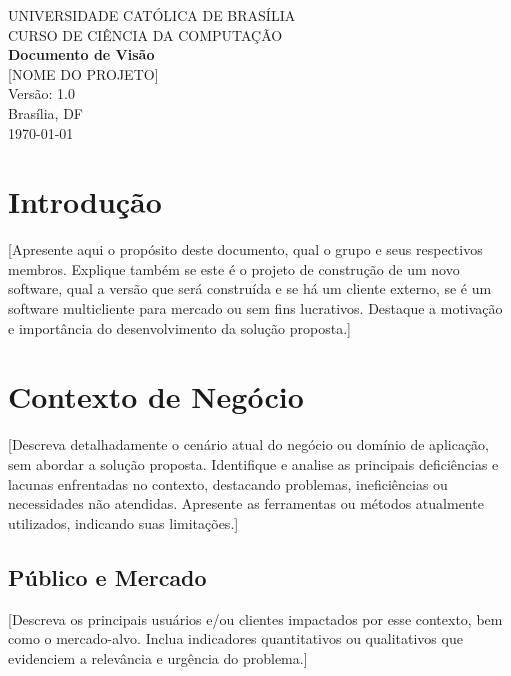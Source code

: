 \documentclass[12pt,a4paper]{report}
\newcommand{\projetoNome}{[NOME DO PROJETO]}
\newcommand{\versao}{1.0}
\newcommand{\data}{\today}
\begin{document}
\begin{titlepage}
    \begin{center}
        \large UNIVERSIDADE CATÓLICA DE BRASÍLIA \\
        \large CURSO DE CIÊNCIA DA COMPUTAÇÃO \\
        \vspace{4cm}
        \huge \textbf{Documento de Visão} \\
        \vspace{1cm}
        \Large \projetoNome \\
        \vspace{4cm}
        \large Versão: \versao \\
        \vfill
        \large Brasília, DF \\
        \large \data
    \end{center}
\end{titlepage}

\tableofcontents
\newpage

\chapter{Introdução}
[Apresente aqui o propósito deste documento, qual o grupo e seus respectivos membros. Explique também se este é o projeto de construção de um novo software, qual a versão que será construída e se há um cliente externo, se é um software multicliente para mercado ou sem fins lucrativos. Destaque a motivação e importância do desenvolvimento da solução proposta.]

\chapter{Contexto de Negócio}
[Descreva detalhadamente o cenário atual do negócio ou domínio de aplicação, sem abordar a solução proposta. Identifique e analise as principais deficiências e lacunas enfrentadas no contexto, destacando problemas, ineficiências ou necessidades não atendidas. Apresente as ferramentas ou métodos atualmente utilizados, indicando suas limitações.]

\section{Público e Mercado}
[Descreva os principais usuários e/ou clientes impactados por esse contexto, bem como o mercado-alvo. Inclua indicadores quantitativos ou qualitativos que evidenciem a relevância e urgência do problema.]
\end{document}
